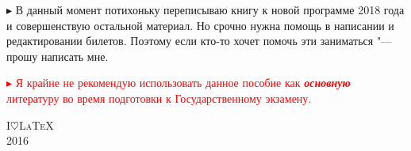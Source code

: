 \begin{flushleft}
$\blacktriangleright$ В данный момент потихоньку переписываю книгу к новой программе 2018 года и совершенствую остальной материал. Но срочно нужна помощь в написании и редактировании билетов. Поэтому если кто-то хочет помочь эти заниматься "--- прошу написать мне. 

\smallskip

\vfill

\textcolor{red}{
$\blacktriangleright$ Я крайне не рекомендую использовать данное пособие как \textit{\textbf{основную}} литературу во время подготовки к Государственному экзамену.
}

\end{flushleft}

\medskip
\vfill
{\huge\scshape I\;$\heartsuit$\;\LaTeX}\\[0.5\baselineskip]
{\LARGE\scshape 2016}\par
\restoregeometry
\endgroup
\newpage